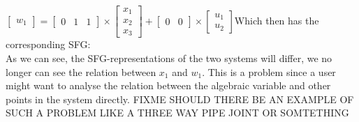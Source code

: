 \newline
$\left[ \begin{array}{c} w_1  \end{array} \right]
=  \begin{bmatrix} 0 & 1 & 1\end{bmatrix} \times \left[ \begin{array}{c} x_1 \\ x_2 \\ x_3 \end{array} \right] + \begin{bmatrix} 0 & 0 \end{bmatrix} \times \left[ \begin{array}{c} u_1 \\ u_2 \end{array} \right]$\newline Which then has the corresponding SFG:\newline
\setlength\fboxsep{0pt}
\setlength\fboxrule{0.5pt}
\\\newline
As we can see, the SFG-representations of the two systems will differ, we no longer can see the relation between $x_1$ and $w_1$. This is a problem since a user might want to analyse the relation between the algebraic variable and other points in the system directly.
FIXME SHOULD THERE BE AN EXAMPLE OF SUCH A PROBLEM LIKE A THREE WAY PIPE JOINT OR SOMTETHING
%
%
%
